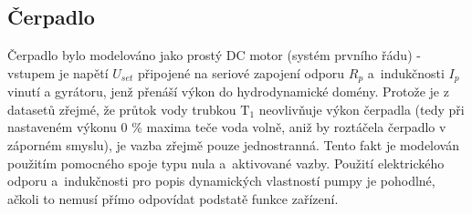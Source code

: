 \documentclass[conference]{IEEEtran}
\begin{document}
\subsection{Čerpadlo}
Čerpadlo bylo modelováno jako prostý DC motor (systém prvního řádu) - vstupem je napětí $U_{set}$ připojené na seriové zapojení odporu $R_p$ a~indukčnosti $I_p$ vinutí
a gyrátoru, jenž přenáší výkon do hydrodynamické domény. Protože je z datasetů zřejmé, že průtok vody trubkou $\text{T}_1$ neovlivňuje
výkon čerpadla (tedy při nastaveném výkonu 0 \% maxima teče voda volně, aniž by roztáčela čerpadlo v záporném smyslu),
je vazba zřejmě pouze jednostranná. Tento fakt je modelován použitím pomocného spoje typu nula a~aktivované vazby.
Použití elektrického odporu a~indukčnosti pro popis dynamických vlastností pumpy je pohodlné,
ačkoli to nemusí přímo odpovídat podstatě funkce zařízení.
\end{document}
